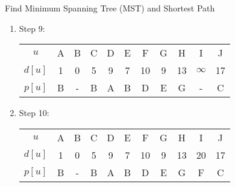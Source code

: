 \documentclass{article}
\numberwithin{table}{section}
\numberwithin{figure}{section}
\begin{document}
\begin{section}{Find Minimum Spanning Tree (MST) and Shortest Path}
\begin{enumerate}[(A)]
\begin{tcolorbox}[breakable]
\begin{enumerate}[(1)]
                \item Step 9:
                \begin{table}[H]
                    \centering
                    \begin{tabular}{c|cccccccccc}
                        \hline
                        $u$ & A & B & C & D & E & F & G & H & I & J \\
                        $d[u]$ & 1 & 0 & 5 & 9 & 7 & 10 & 9 & 13 & $\infty$ & 17 \\
                        $p[u]$ & B & - & B & A & B & D & E & G & - & C \\
                        \hline
                    \end{tabular}
                \end{table}
                

                \item Step 10:
                \begin{table}[H]
                    \centering
                    \begin{tabular}{c|cccccccccc}
                        \hline
                        $u$ & A & B & C & D & E & F & G & H & I & J \\
                        $d[u]$ & 1 & 0 & 5 & 9 & 7 & 10 & 9 & 13 & 20 & 17 \\
                        $p[u]$ & B & - & B & A & B & D & E & G & F & C \\
                        \hline
                    \end{tabular}
                \end{table}
                


\end{enumerate}
\end{tcolorbox}
\end{enumerate}
\end{section}
\end{document}
